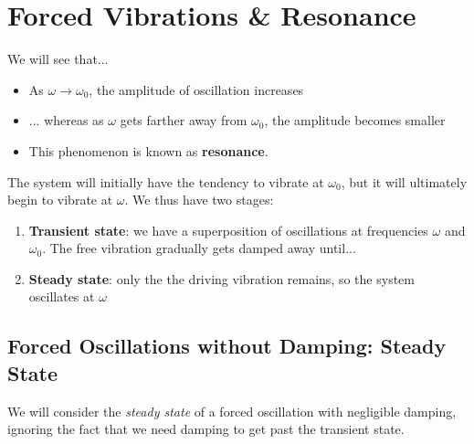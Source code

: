 \chapter{Forced Vibrations \& Resonance}

\vspace{0.5em}

We will see that...
\begin{itemize}
	\item As $\omega \to \omega_0$, the amplitude of oscillation increases
	\item ... whereas as $\omega$ gets farther away from $\omega_0$, the amplitude becomes smaller
	\item This phenomenon is known as \textbf{resonance}.
\end{itemize}

The system will initially have the tendency to vibrate at $\omega_0$, but it will ultimately begin to vibrate at $\omega$. We thus have two stages:
\begin{enumerate}
	\item \textbf{Transient state}: we have a superposition of oscillations at frequencies $\omega$ and $\omega_0$. The free vibration gradually gets damped away until...
	\item \textbf{Steady state}: only the the driving vibration remains, so the system oscillates at $\omega$
\end{enumerate}

\section{Forced Oscillations without Damping: Steady State}
We will consider the \emph{steady state} of a forced oscillation with negligible damping, ignoring the fact that we need damping to get past the transient state.

